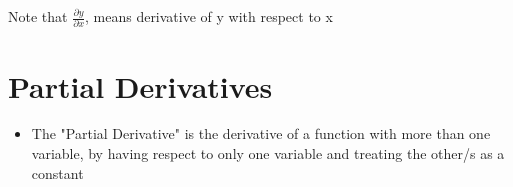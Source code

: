 \documentclass[10pt,a4paper]{article}
\begin{document}
Note that $\frac{\partial{y}}{\partial{x}}$, means derivative of y with respect to x

\section{Partial Derivatives}

\begin{itemize}
    \item The "Partial Derivative" is the derivative of a function with more than one variable, by having respect to only one variable and treating the other/s as a constant
\end{itemize}
\end{document}
